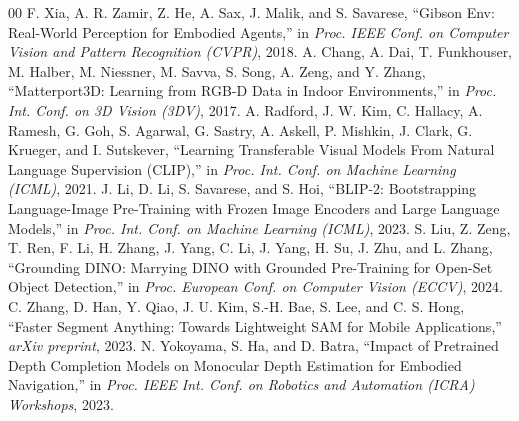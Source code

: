 \documentclass[conference]{IEEEtran}
\begin{document}
\begin{thebibliography}{00}
 F. Xia, A. R. Zamir, Z. He, A. Sax, J. Malik, and S. Savarese, ``Gibson Env: Real-World Perception for Embodied Agents,'' in \emph{Proc. IEEE Conf. on Computer Vision and Pattern Recognition (CVPR)}, 2018.
 A. Chang, A. Dai, T. Funkhouser, M. Halber, M. Niessner, M. Savva, S. Song, A. Zeng, and Y. Zhang, ``Matterport3D: Learning from RGB-D Data in Indoor Environments,'' in \emph{Proc. Int. Conf. on 3D Vision (3DV)}, 2017.
 A. Radford, J. W. Kim, C. Hallacy, A. Ramesh, G. Goh, S. Agarwal, G. Sastry, A. Askell, P. Mishkin, J. Clark, G. Krueger, and I. Sutskever, ``Learning Transferable Visual Models From Natural Language Supervision (CLIP),'' in \emph{Proc. Int. Conf. on Machine Learning (ICML)}, 2021.
 J. Li, D. Li, S. Savarese, and S. Hoi, ``BLIP-2: Bootstrapping Language-Image Pre-Training with Frozen Image Encoders and Large Language Models,'' in \emph{Proc. Int. Conf. on Machine Learning (ICML)}, 2023.
 S. Liu, Z. Zeng, T. Ren, F. Li, H. Zhang, J. Yang, C. Li, J. Yang, H. Su, J. Zhu, and L. Zhang, ``Grounding DINO: Marrying DINO with Grounded Pre-Training for Open-Set Object Detection,'' in \emph{Proc. European Conf. on Computer Vision (ECCV)}, 2024.
 C. Zhang, D. Han, Y. Qiao, J. U. Kim, S.-H. Bae, S. Lee, and C. S. Hong, ``Faster Segment Anything: Towards Lightweight SAM for Mobile Applications,'' \emph{arXiv preprint}, 2023.
 N. Yokoyama, S. Ha, and D. Batra, ``Impact of Pretrained Depth Completion Models on Monocular Depth Estimation for Embodied Navigation,'' in \emph{Proc. IEEE Int. Conf. on Robotics and Automation (ICRA) Workshops}, 2023.
\end{thebibliography}
\end{document}
